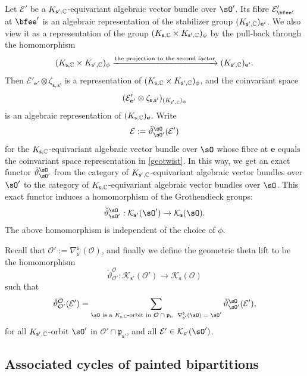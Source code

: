 \documentclass[11pt,a4paper]{amsart}
\newcommand{\CE}{{\mathcal {E}}}
\newcommand{\CK}{{\mathcal {K}}}
\newcommand{\CO}{{\mathcal {O}}}
\newcommand{\p}{\mathfrak p}
\numberwithin{equation}{section}
\theoremstyle{remark}
\begin{document}
 Let $\CE'$ be a $K_{\mathsf s',\mathbb{C}}$-equivariant algebraic vector bundle  over $\sO'$. Its fibre
$\CE'_{\bfee'}$ at $\bfee'$ is an algebraic representation of the stabilizer group $(K_{\mathsf s',\mathbb{C}})_{\mathbf e'}$. We also view it as a representation of the group
$(K_{\mathsf s,\mathbb{C}}\times K_{\mathsf s', \mathbb{C}})_\phi$ by the pull-back through the homomorphism
\[
  (K_{\mathsf s,\mathbb{C}}\times K_{\mathsf s', \mathbb{C}})_\phi\xrightarrow{\textrm{the projection to the second factor}} (K_{\mathsf s',\mathbb{C}})_{\mathbf e'}.
\]
Then $\CE'_{\mathbf e'} \otimes \zeta_{\mathsf s, \mathsf s'}$ is a representation of $ (K_{\mathsf s,\mathbb{C}}\times K_{\mathsf s', \mathbb{C}})_\phi$, and the coinvariant space
\begin{equation}\label{geotwist}
(\CE'_{\mathbf e'} \otimes \zeta_{\mathsf s, \mathsf s'})_{ (K_{\mathsf s',\C})_\phi}
\end{equation}
 is an algebraic representation of $(K_{\mathsf s,\mathbb{C}})_{\mathbf e}$. Write
 \begin{equation}\label{liftab}
\CE:= \check \vartheta_{\sO'}^{\sO}(\mathcal E')
\end{equation}
for the  $K_{\mathsf s,\mathbb{C}}$-equivariant algebraic vector bundle  over $\sO$ whose fibre at $\mathbf e$ equals the coinvariant space representation in \eqref{geotwist}. In this way, we get an exact functor $  \check \vartheta_{\sO'}^{\sO}$ from the category of
$K_{\mathsf s',\mathbb{C}}$-equivariant algebraic vector bundles  over $\sO'$ to the category of $K_{\mathsf s,\mathbb{C}}$-equivariant algebraic vector bundles  over $\sO$. This exact functor induces a  homomorphism of the  Grothendieck groups:
\[
   \check \vartheta_{\sO'}^{\sO}:  \CK_{\mathsf s'}(\sO')\rightarrow  \CK_{\mathsf s}(\sO).
\]
The above homomorphism is independent of the choice of $\phi$.


Recall that $\CO':= \nabla^{\mathsf s}_{\mathsf s'}(\CO)$, and finally we define the geometric theta lift to be the homomorphism
\begin{equation}\label{defn:geolift}
 \check \vartheta_{\CO'}^{\CO}: \CK_{\mathsf s'}(\CO')\rightarrow \CK_{\mathsf s}(\CO)
\end{equation}
such that
\[
 \check \vartheta_{\CO'}^{\CO}(\CE')= \sum_{\sO\textrm{ is a $K_{\mathsf s, \C} $-orbit in $\CO\cap \p_{\mathsf s}$,  $\, \nabla^{\mathsf s}_{\mathsf s'}(\sO)=\sO'$}}    \check \vartheta_{\sO'}^{\sO}(\CE'),
\]
for all $K_{\mathsf s', \mathbb{C}} $-orbit $\sO'$ in $\CO'\cap \p_{\mathsf s'}$, and all $\CE'\in \CK_{\mathsf s'}(\sO')$.


\subsection{Associated cycles of painted bipartitions}\label{subsecass}
\end{document}
